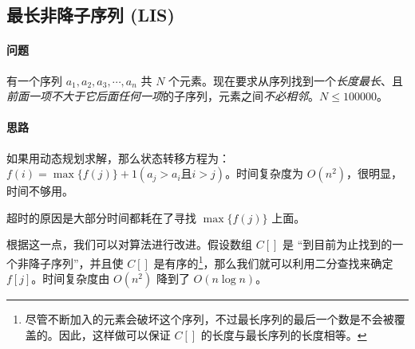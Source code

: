 \subsection{最长非降子序列 (LIS)}
	\paragraph{问题} 有一个序列 $a_1,a_2,a_3,\cdots,a_n$ 共 $N$ 个元素。现在要求从序列找到一个\emph{长度最长}、且\emph{前面一项不大于它后面任何一项}的子序列，元素之间\emph{不必相邻}。$N\leqslant 100000$。

	\paragraph{思路} 如果用动态规划求解，那么状态转移方程为：$f(i)=\max\{f(j)\}+1 (a_j>a_i \textrm{且} i>j)$。时间复杂度为 $O(n^2)$，很明显，时间不够用。
	
	超时的原因是大部分时间都耗在了寻找 $\max\{f(j)\}$ 上面。

	根据这一点，我们可以对算法进行改进。假设数组 $C[]$ 是 “到目前为止找到的一个非降子序列”，并且使 $C[]$ 是有序的\footnote{尽管不断加入的元素会破坏这个序列，不过最长序列的最后一个数是不会被覆盖的。因此，这样做可以保证 $C[]$ 的长度与最长序列的长度相等。}，那么我们就可以利用二分查找来确定 $f[j]$。时间复杂度由 $O(n^{2})$ 降到了 $O(n\log n)$。
	
	